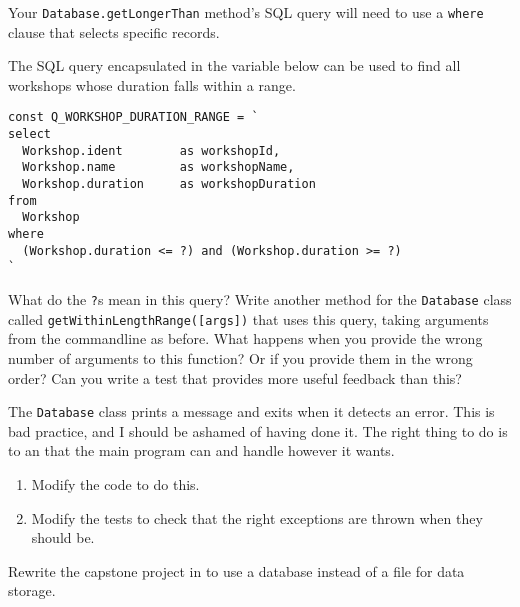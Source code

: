 Your \texttt{Database.getLongerThan} method's SQL query
will need to use a \texttt{where} clause
that selects specific records.


The SQL query encapsulated in the variable below can be used to
find all workshops whose duration falls within a range.

\begin{verbatim}
const Q_WORKSHOP_DURATION_RANGE = `
select
  Workshop.ident        as workshopId,
  Workshop.name         as workshopName,
  Workshop.duration     as workshopDuration
from
  Workshop
where
  (Workshop.duration <= ?) and (Workshop.duration >= ?)
`
\end{verbatim}

What do the \texttt{?}s mean in this query?
Write another method for the \texttt{Database} class called \texttt{getWithinLengthRange([args])}
that uses this query, taking arguments from the commandline as before.
What happens when you provide the wrong number of arguments to this function? Or
if you provide them in the wrong order?
Can you write a test that provides more useful feedback than this?


The \texttt{Database} class prints a message and exits when it detects an error.
This is bad practice,
and I should be ashamed of having done it.
The right thing to do is to 
an 
that the main program can 
and handle however it wants.

\begin{enumerate}
\item
  Modify the code to do this.
\item
  Modify the tests to check that the right exceptions are thrown when they should be.
\end{enumerate}


Rewrite the capstone project in  to use a database instead of a file for data storage.
